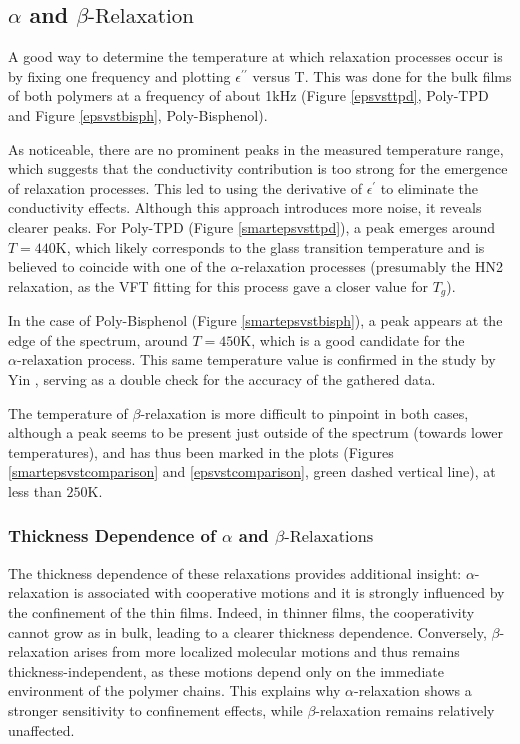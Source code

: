 \subsection{$\alpha$ and $\beta\text{-Relaxation}$}
A good way to determine the temperature at which relaxation processes occur is by fixing one frequency and plotting $\epsilon^{\prime\prime}$ versus T. This was done for the bulk films of both polymers at a frequency of about 1kHz (Figure \ref{epsvsttpd}, Poly-TPD and Figure \ref{epsvstbisph}, Poly-Bisphenol).

As noticeable, there are no prominent peaks in the measured temperature range, which suggests that the conductivity contribution is too strong for the emergence of relaxation processes. This led to using the derivative of $\epsilon^{\prime}$ to eliminate the conductivity effects. Although this approach introduces more noise, it reveals clearer peaks. For Poly-TPD (Figure \ref{smartepsvsttpd}), a peak emerges around $T = 440 \text{K}$, which likely corresponds to the glass transition temperature and is believed to coincide with one of the $\alpha$-relaxation processes (presumably the HN2 relaxation, as the VFT fitting for this process gave a closer value for $T_g$).

In the case of Poly-Bisphenol (Figure \ref{smartepsvstbisph}), a peak appears at the edge of the spectrum, around $T = 450 \text{K}$, which is a good candidate for the $\alpha\text{-relaxation}$ process. This same temperature value is confirmed in the study by Yin \cite{yin2012}, serving as a double check for the accuracy of the gathered data.

The temperature of $\beta$-relaxation is more difficult to pinpoint in both cases, although a peak seems to be present just outside of the spectrum (towards lower temperatures), and has thus been marked in the plots (Figures \ref{smartepsvstcomparison} and \ref{epsvstcomparison}, green dashed vertical line), at less than $250 \text{K}$.
\subsubsection{Thickness Dependence of $\alpha$ and $\beta\text{-Relaxations}$}
The thickness dependence of these relaxations provides additional insight: $\alpha$-relaxation is associated with cooperative motions and it is strongly influenced by the confinement of the thin films. Indeed, in thinner films, the cooperativity cannot grow as in bulk, leading to a clearer thickness dependence.
Conversely, $\beta$-relaxation arises from more localized molecular motions and thus remains thickness-independent, as these motions depend only on the immediate environment of the polymer chains. This explains why $\alpha$-relaxation shows a stronger sensitivity to confinement effects, while $\beta$-relaxation remains relatively unaffected.

